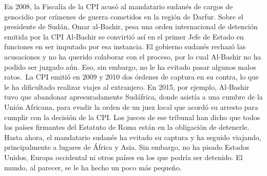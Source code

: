 \documentclass{article}%
\begin{document}
\newline%
%
En 2008, la Fiscalía de la CPI acusó al mandatario sudanés de cargos de genocidio por crímenes de guerra cometidos en la región de Darfur.%
\newline%
%
Sobre el presidente de Sudán, Omar al{-}Bashir, pesa una orden internacional de detención emitida por la CPI%
\newline%
%
Al{-}Bashir se convirtió así en el primer Jefe de Estado en funciones en ser imputado por esa instancia.%
\newline%
%
El gobierno sudanés rechazó las acusaciones y no ha querido colaborar con el proceso, por lo cual Al{-}Bashir no ha podido ser juzgado aún.%
\newline%
%
Eso, sin embargo, no le ha evitado pasar algunos malos ratos.~La CPI emitió en 2009 y 2010 dos órdenes de captura en su contra, lo que le ha dificultado realizar viajes al extranjero.%
\newline%
%
En 2015, por ejemplo, Al{-}Bashir tuvo que abandonar apresuradamente Sudáfrica, donde asistía a una cumbre de la Unión Africana, para evadir la orden de un juez local que acordó su arresto para cumplir con la decisión de la CPI.%
\newline%
%
Los jueces de ese tribunal han dicho que todos los países firmantes del Estatuto de Roma están en la obligación de detenerle.%
\newline%
%
Hasta ahora, el mandatario sudanés ha evitado su captura y ha seguido viajando, principalmente a lugares de África y Asia.%
\newline%
%
Sin embargo, no ha pisado Estados Unidos, Europa occidental ni otros países en los que podría ser detenido.%
\newline%
%
El mundo, al parecer, se le ha hecho un poco más pequeño.%
\newline%
%
\end{document}
